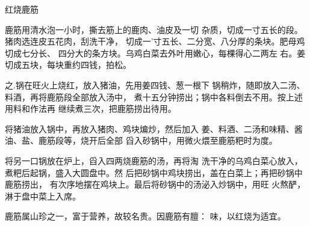 \begin{recipe}{红烧鹿筋}

\ingredients


\cooking

\step 鹿筋用清水泡一小时，撕去筋上的鹿肉、油皮及一切 杂质，切成一寸五长的段。猪肉选连皮五花肉，刮洗干净， 切成一'寸五长、二分宽、八分厚的条块。肥母鸡切成七分长、 四分大的条方块。乌鸡白菜去外叶用嫩心，每棵得心二两左 右。姜切成五块，每块重约四钱，拍松。

之.锅在旺火上烧红，放入猪油，先用姜四钱、葱一根下 锅稍炸，随即放入二汤、料酒，再将鹿筋段全部放入汤中， 煮十五分钟捞出；锅中各料倒去不用。按上述用料和作法再 继续煮三次，把鹿筋捞出待用。

\step 将猪油放入锅中，再放入猪肉、鸡块煸炒，然后加入 姜、料酒、二汤和味精、酱油、盐、鹿筋段等，烧开后全部 舀入砂锅中，用微火煨至鹿筋粑时为度。

\step 将另一口锅放在炉上，舀入四两烧鹿筋的汤，再将淘 洗干净的乌鸡白菜心放入，煮粑后起锅，盛入大圆盘中。然 后把砂锅中鸡块捞出，盖在白菜上；再把砂锅中鹿筋捞出， 有次序地摆在鸡块上。最后将砂锅中的汤泌入炒锅中，用旺 火熬酽，淋于盘中菜上入席。

\notes

鹿筋属山珍之一，富于营养，故较名贵。因鹿筋有膻： 味，以红烧为适宜。

\end{recipe}

